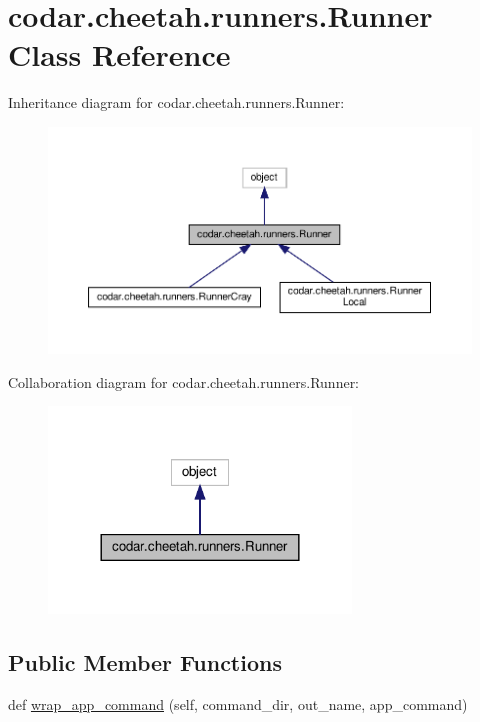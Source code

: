 \hypertarget{classcodar_1_1cheetah_1_1runners_1_1_runner}{}\section{codar.\+cheetah.\+runners.\+Runner Class Reference}
\label{classcodar_1_1cheetah_1_1runners_1_1_runner}


Inheritance diagram for codar.\+cheetah.\+runners.\+Runner\+:
\nopagebreak
\begin{figure}[H]
\begin{center}
\leavevmode
\includegraphics[width=350pt]{classcodar_1_1cheetah_1_1runners_1_1_runner__inherit__graph}
\end{center}
\end{figure}


Collaboration diagram for codar.\+cheetah.\+runners.\+Runner\+:
\nopagebreak
\begin{figure}[H]
\begin{center}
\leavevmode
\includegraphics[width=228pt]{classcodar_1_1cheetah_1_1runners_1_1_runner__coll__graph}
\end{center}
\end{figure}
\subsection*{Public Member Functions}
\begin{DoxyCompactItemize}
\item 
def \hyperlink{classcodar_1_1cheetah_1_1runners_1_1_runner_a542d501b4c640bb9c27b2777a831c351}{wrap\+\_\+app\+\_\+command} (self, command\+\_\+dir, out\+\_\+name, app\+\_\+command)
\end{DoxyCompactItemize}
